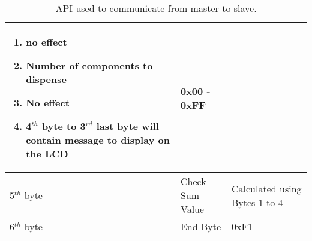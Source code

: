 \documentclass[a4paper,11pt]{article}
\numberwithin{figure}{section}
\numberwithin{table}{section}
\begin{document}
\begin{center}
\begin{table}[ht]
\begin{tabular}{| m{3cm} | m{5cm}| m{5cm} |}
\begin{enumerate}
																				\setlength{\itemsep}{0pt}
   																				\setlength{\parskip}{0pt}
    																			\setlength{\parsep}{0pt} 
																				\item no effect
																				\item Number of components to dispense
																				\item No effect
																				\item 4$^{th}$ byte to 3$^{rd}$ last byte will contain message to display on the LCD
																			\end{enumerate}	 & 0x00 - 0xFF \\
			\hline
			5$^{th}$ byte & Check Sum Value & Calculated using Bytes 1 to 4 \\
			\hline
			6$^{th}$ byte & End Byte & 0xF1 \\
			\hline
			\end{tabular}
			\caption{API used to communicate from master to slave. \label{tab:M2SAPI}}
		\end{table}
	\end{center}
	\newpage
\end{document}
